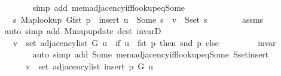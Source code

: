 \begin{isabellebody}
\ \ \ \ \ \ \isamarkupfalse%
\ {\isacharparenleft}{\kern0pt}simp\ add{\isacharcolon}{\kern0pt}\ mem{\isacharunderscore}{\kern0pt}adjacency{\isacharunderscore}{\kern0pt}iff{\isacharunderscore}{\kern0pt}lookup{\isacharunderscore}{\kern0pt}eq{\isacharunderscore}{\kern0pt}Some{\isacharparenright}{\kern0pt}\isanewline
\ \ \ \ \isamarkupfalse%
\ \isamarkupfalse%
\ {\isachardoublequoteopen}{\isachardot}{\kern0pt}{\isachardot}{\kern0pt}{\isachardot}{\kern0pt}\ {\isasymlongleftrightarrow}\ {\isacharparenleft}{\kern0pt}{\isasymexists}s{\isachardot}{\kern0pt}\ {\isacharparenleft}{\kern0pt}Map{\isacharunderscore}{\kern0pt}lookup\ G{\isacharparenleft}{\kern0pt}fst\ p\ {\isasymmapsto}\ {\isacharquery}{\kern0pt}insert{\isacharparenright}{\kern0pt}{\isacharparenright}{\kern0pt}\ u\ {\isacharequal}{\kern0pt}\ Some\ s\ {\isasymand}\ v\ {\isasymin}\ S{\isachardot}{\kern0pt}set\ s{\isacharparenright}{\kern0pt}{\isachardoublequoteclose}\isanewline
\ \ \ \ \ \ \isamarkupfalse%
\ assms\isanewline
\ \ \ \ \ \ \isamarkupfalse%
\ {\isacharparenleft}{\kern0pt}auto\ simp\ add{\isacharcolon}{\kern0pt}\ M{\isachardot}{\kern0pt}map{\isacharunderscore}{\kern0pt}update\ dest{\isacharcolon}{\kern0pt}\ invarD{\isacharparenleft}{\kern0pt}{}{\isacharparenright}{\kern0pt}{\isacharparenright}{\kern0pt}\isanewline
\ \ \ \ \isamarkupfalse%
\ \isamarkupfalse%
\ {\isachardoublequoteopen}{\isachardot}{\kern0pt}{\isachardot}{\kern0pt}{\isachardot}{\kern0pt}\ {\isasymlongleftrightarrow}\ v\ {\isasymin}\ set\ {\isacharparenleft}{\kern0pt}adjacency{\isacharunderscore}{\kern0pt}list\ G\ u{\isacharparenright}{\kern0pt}\ {\isasymunion}\ {\isacharparenleft}{\kern0pt}if\ u\ {\isacharequal}{\kern0pt}\ fst\ p\ then\ {\isacharbraceleft}{\kern0pt}snd\ p{\isacharbraceright}{\kern0pt}\ else\ {\isacharbraceleft}{\kern0pt}{\isacharbraceright}{\kern0pt}{\isacharparenright}{\kern0pt}{\isachardoublequoteclose}\isanewline
\ \ \ \ \ \ \isamarkupfalse%
\ invar\isanewline
\ \ \ \ \ \ \isamarkupfalse%
\ {\isacharparenleft}{\kern0pt}auto\ simp\ add{\isacharcolon}{\kern0pt}\ Some\ mem{\isacharunderscore}{\kern0pt}adjacency{\isacharunderscore}{\kern0pt}iff{\isacharunderscore}{\kern0pt}lookup{\isacharunderscore}{\kern0pt}eq{\isacharunderscore}{\kern0pt}Some\ S{\isachardot}{\kern0pt}set{\isacharunderscore}{\kern0pt}insert{\isacharparenright}{\kern0pt}\isanewline
\ \ \ \ \isamarkupfalse%
\ \isamarkupfalse%
\isanewline
\ \ \ \ \ \ {\isachardoublequoteopen}v\ {\isasymin}\ set\ {\isacharparenleft}{\kern0pt}adjacency{\isacharunderscore}{\kern0pt}list\ {\isacharparenleft}{\kern0pt}insert\ p\ G{\isacharparenright}{\kern0pt}\ u{\isacharparenright}{\kern0pt}\ {\isasymlongleftrightarrow}\isanewline

\end{isabellebody}
